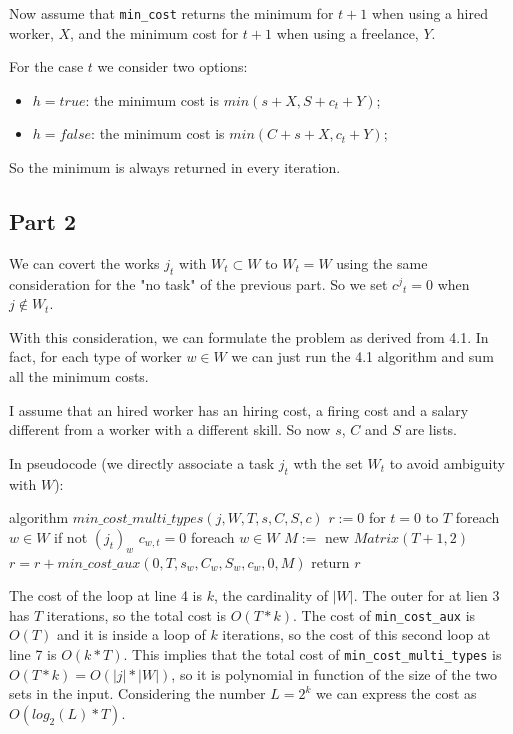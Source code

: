 \documentclass[paper=a4, fontsize=11pt]{scrartcl} %
\numberwithin{equation}{section} %
\numberwithin{figure}{section} %
\numberwithin{table}{section} %
\begin{document}
Now assume that \verb|min_cost| returns the minimum for $t+1$ when using a hired worker, $X$, and the minimum cost for $t+1$ when using a freelance, $Y$.

For the case $t$ we consider two options:
\begin{itemize}
    \item $h = true$: the minimum cost is $min(s + X, S + c_t + Y)$;
    \item $h = false$: the minimum cost is $min(C + s + X, c_t + Y)$;
\end{itemize}

So the minimum is always returned in every iteration.

\subsection*{Part 2}

We can covert the works $j_t$ with $W_t \subset W$ to $W_t = W$ using the same consideration for the "no task" of the previous part.
So we set ${c^j}_t = 0$ when $j \notin W_t$.

With this consideration, we can formulate the problem as derived from 4.1.
In fact, for each type of worker $w \in W$ we can just run the 4.1 algorithm and sum all the minimum costs.

I assume that an hired worker has an hiring cost, a firing cost and a salary different from a worker with a different skill. So now $s$, $C$ and $S$ are lists.

In pseudocode (we directly associate a task $j_t$ wth the set $W_t$ to avoid ambiguity with $W$):

\begin{pseudo}
algorithm $min\_cost\_multi\_types(j, W, T, s, C, S, c)$
    $r := 0$
    for $t = 0$ to $T$
        foreach $w \in W$
            if not $(j_t)_w$
                $c_{w,t} = 0$
    foreach $w \in W$
        $M :=$ new $Matrix(T+1, 2)$
        $r = r + min\_cost\_aux(0, T, s_w, C_w, S_w, c_w, 0, M)$
    return $r$
\end{pseudo}

The cost of the loop at line 4 is $k$, the cardinality of $|W|$.
The outer for at lien 3 has $T$ iterations, so the total cost is $O(T*k)$.
The cost of \verb|min_cost_aux| is $O(T)$ and it is inside a loop of $k$ iterations, so the cost of this second loop at line 7 is $O(k*T)$.
This implies that the total cost of \verb|min_cost_multi_types| is $O(T*k) = O(|j|*|W|)$, so it is polynomial in function of the size of the two sets in the input.
Considering the number $L = 2^k$ we can express the cost as $O(log_2(L)*T)$.
\end{document}
